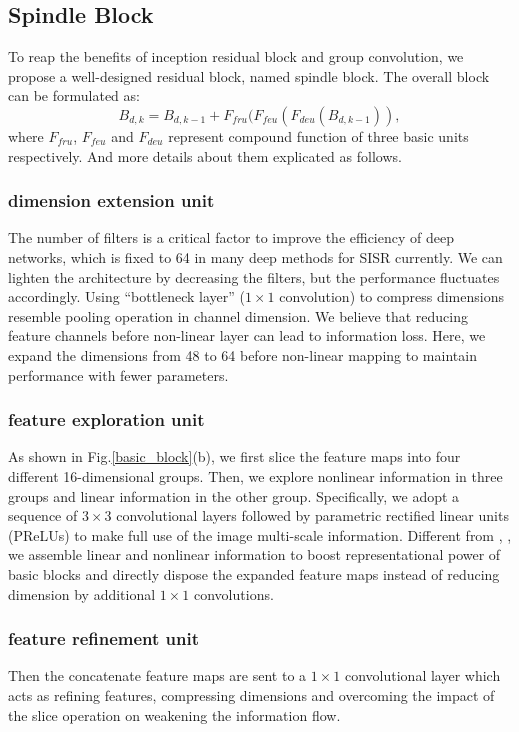\documentclass[journal]{IEEEtran}
\begin{document}
\subsection{Spindle Block}
To reap the benefits of inception residual block \cite{szegedy2017inception} and group convolution, we propose a well-designed residual block, named spindle block. The overall block can be formulated as:
\begin{equation}
B_{d,k}=B_{d,k-1}+F_{fru}(F_{feu}(F_{deu}(B_{d,k-1})),
\label{spindle_equation}
\end{equation}
where $F_{fru}$, $F_{feu}$ and $F_{deu}$ represent compound function of three basic units respectively. And more details about them explicated as follows.
\subsubsection{dimension extension unit}
The number of filters is a critical factor to improve the efficiency of deep networks, which is fixed to 64 in many deep methods for SISR currently. We can lighten the architecture by decreasing the filters, but the performance fluctuates accordingly. Using ``bottleneck layer'' \cite{szegedy2015going} ($1\times 1$ convolution) to compress dimensions resemble pooling operation in channel dimension. We believe that reducing feature channels before non-linear layer can lead to information loss. Here, we expand the dimensions from 48 to 64 before non-linear mapping to maintain performance with fewer parameters. 
\subsubsection{feature exploration unit}
As shown in Fig.\ref{basic_block}(b), we first slice the feature maps into four different 16-dimensional groups. Then, we explore nonlinear information in three groups and linear information in the other group. Specifically, we adopt a sequence of $3\times 3$ convolutional layers followed by parametric rectified linear units (PReLUs) to make full use of the image multi-scale information. Different from \cite{szegedy2015going}, \cite{szegedy2017inception}, we assemble linear and nonlinear information to boost representational power of basic blocks and directly dispose the expanded feature maps instead of reducing dimension by additional $1\times 1$ convolutions.
\subsubsection{feature refinement unit}
Then the concatenate feature maps are sent to a $1\times 1$ convolutional layer which acts as refining features, compressing dimensions and overcoming the impact of the slice operation on weakening the information flow.
\end{document}
